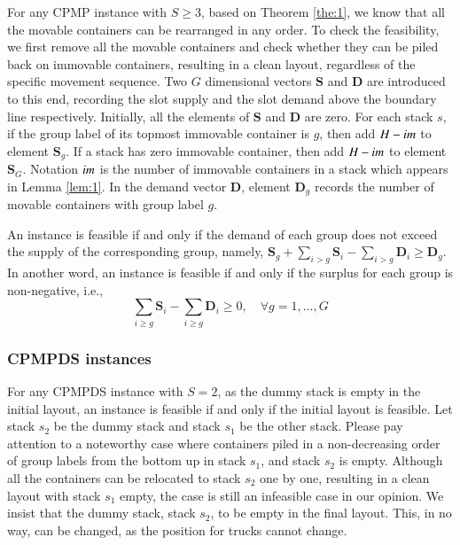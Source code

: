 \documentclass[review,3p,times,authoryear,12pt]{elsarticle}
\begin{document}
For any CPMP instance with $S\ge3$, based on Theorem \ref{the:1}, we know that all the movable containers can be rearranged in any order.
To check the feasibility, we first remove all the movable containers and check whether they can be piled back on immovable containers, resulting in a clean layout, regardless of the specific movement sequence. Two $G$ dimensional vectors $\mathbf S$ and $\mathbf D$ are introduced to this end, recording the slot supply and the slot demand above the boundary line respectively.
Initially, all the elements of $\mathbf S$ and $\mathbf D$ are zero. For each stack $s$, if the group label of its topmost immovable container is $g$, then add $H-\id{im}$ to element $\mathbf S_g$.
If a stack has zero immovable container, then add $H-\id{im}$ to element $\mathbf S_G$. Notation $\id{im}$ is the number of immovable containers in a stack which appears in Lemma \ref{lem:1}. In the demand vector $\mathbf D$, element $\mathbf D_g$ records the number of movable containers with group label $g$.

An instance is feasible if and only if the demand of each group does not exceed the supply of the corresponding group, namely, $\mathbf S_g+\sum\limits_{i>g}\mathbf S_i-\sum\limits_{i>g}\mathbf D_i\ge \mathbf D_g$.
In another word, an instance is feasible if and only if the surplus for each group is non-negative, i.e.,
\begin{equation}
\label{equ:2}
\sum\limits_{i\ge g}\mathbf S_i-\sum\limits_{i\ge g}\mathbf D_i\ge0, \quad \forall g=1,\dots,G
\end{equation}

\subsubsection{CPMPDS instances}

For any CPMPDS instance with $S=2$, as the dummy stack is empty in the initial layout, an instance is feasible if and only if the initial layout is feasible. Let stack $s_2$ be the dummy stack and stack $s_1$ be the other stack. Please pay attention to a noteworthy case where containers piled in a non-decreasing order of group labels from the bottom up in stack $s_1$, and stack $s_2$ is empty. Although all the containers can be relocated to stack $s_2$ one by one, resulting in a clean layout with stack $s_1$ empty, the case is still an infeasible case in our opinion. We insist that the dummy stack, stack $s_2$, to be empty in the final layout. This, in no way, can be changed, as the position for trucks cannot change.
\end{document}
